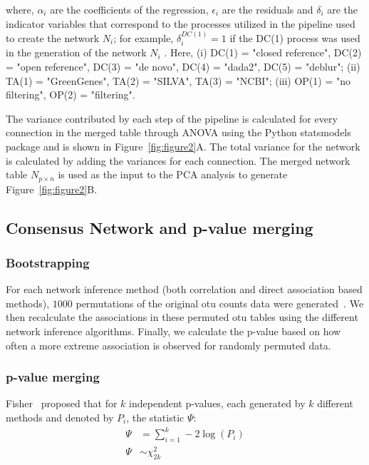    where, $\alpha_i$ are the coefficients of the regression, $\epsilon_i$ are the residuals and $\delta_i$ are the indicator variables that correspond to the processes utilized in the pipeline used to create the network $N_i$; for example, $\delta^{DC(1)}_i = 1$ if the DC(1) process was used in the generation of the network $N_i$ .
   Here, (i) DC(1) = "closed reference", DC(2) = "open reference", DC(3) = "de novo", DC(4) = "dada2", DC(5) = "deblur"; (ii)  TA(1) = "GreenGenes", TA(2) = "SILVA", TA(3) = "NCBI"; (iii) OP(1) = "no filtering", OP(2) = "filtering".

  The variance contributed by each step of the pipeline is calculated for every connection in the merged table through ANOVA using the Python statsmodels package and is shown in Figure~\ref{fig:figure2}A.
  The total variance for the network is calculated by adding the variances for each connection.
  The merged network table $N_{p \times n}$ is used as the input to the PCA analysis to generate Figure~\ref{fig:figure2}B.

  \subsection*{Consensus Network and p-value merging}
  \vspace{-5mm}

  \subsubsection*{Bootstrapping}
  For each network inference method (both correlation and direct association based methods), $1000$ permutations of the original \ac{otu} counts data were generated~\cite{Watts2018}.
  We then recalculate the associations in these permuted \ac{otu} tables using the different network inference algorithms.
  Finally, we calculate the p-value based on how often a more extreme association is observed for randomly permuted data.

  \subsubsection*{p-value merging}
  Fisher~\cite{fisher_224a_1948} proposed that for $k$ independent p-values, each generated by $k$ different methods and denoted by $P_i$, the statistic $\Psi$:
  \begin{equation*}
    \begin{aligned}
        \Psi &= \sum_{i=1}^k -2 \log \left( P_i \right) \\
        \Psi &\sim \chi^2_{2k}
    \end{aligned}
  \end{equation*}

